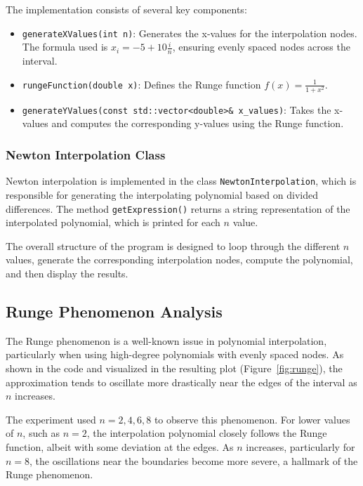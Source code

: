 \documentclass{article}
\begin{document}
The implementation consists of several key components:

\begin{itemize}
    \item \texttt{generateXValues(int n)}: Generates the x-values for the interpolation nodes. The formula used is $x_i = -5 + 10 \frac{i}{n}$, ensuring evenly spaced nodes across the interval.
    \item \texttt{rungeFunction(double x)}: Defines the Runge function $f(x) = \frac{1}{1+x^2}$.
    \item \texttt{generateYValues(const std::vector<double>\& x\_values)}: Takes the x-values and computes the corresponding y-values using the Runge function.
\end{itemize}

\subsubsection{Newton Interpolation Class}

Newton interpolation is implemented in the class \texttt{NewtonInterpolation}, which is responsible for generating the interpolating polynomial based on divided differences. The method \texttt{getExpression()} returns a string representation of the interpolated polynomial, which is printed for each $n$ value.

The overall structure of the program is designed to loop through the different $n$ values, generate the corresponding interpolation nodes, compute the polynomial, and then display the results.

\subsection{Runge Phenomenon Analysis}

The Runge phenomenon is a well-known issue in polynomial interpolation, particularly when using high-degree polynomials with evenly spaced nodes. As shown in the code and visualized in the resulting plot (Figure~\ref{fig:runge}), the approximation tends to oscillate more drastically near the edges of the interval as $n$ increases. 

The experiment used $n = 2, 4, 6, 8$ to observe this phenomenon. For lower values of $n$, such as $n=2$, the interpolation polynomial closely follows the Runge function, albeit with some deviation at the edges. As $n$ increases, particularly for $n=8$, the oscillations near the boundaries become more severe, a hallmark of the Runge phenomenon.
\end{document}
